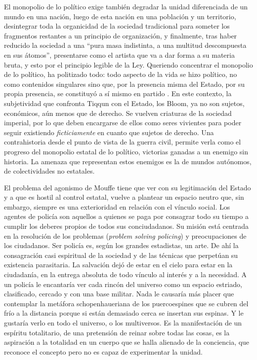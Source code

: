 El monopolio de lo político exige también degradar la unidad diferenciada de un mundo en una nación, luego de esta nación en una población y un territorio, desintegrar toda la organicidad de la sociedad tradicional para someter los fragmentos restantes a un principio de organización, y finalmente, tras haber reducido la sociedad a una \enquote{pura masa indistinta, a una multitud descompuesta en sus átomos}, presentarse como el artista que va a dar forma a su materia bruta, y esto por el principio legible de la Ley. Queriendo concentrar el monopolio de lo político, ha politizado todo: todo aspecto de la vida se hizo político, no como contenidos singulares sino que, por la presencia misma del Estado, por su propia presencia, se constituyó a sí mismo en partido \autocite{tiqqunIntroduccionGuerraCivil2008}. En este contexto, la subjetividad que confronta Tiqqun con el Estado, los Bloom, ya no son sujetos, económicos, aún menos que de derecho. Se vuelven criaturas de la sociedad imperial, por lo que deben encargarse de ellos como seres vivientes para poder seguir existiendo \emph{ficticiamente} en cuanto que sujetos de derecho. Una contrahistoria desde el punto de vista de la guerra civil, permite verla como el progreso del monopolio estatal de lo político, victorias ganadas a un enemigo sin historia. La amenaza que representan estos enemigos es la de mundos autónomos, de colectividades no estatales.

El problema del agonismo de Mouffe tiene que ver con su legitimación del Estado y a que es hostil al control estatal, vuelve a plantear un espacio neutro que, sin embargo, siempre es una exterioridad en relación con el vínculo social. Los agentes de policía son aquellos a quienes se paga por consagrar todo su tiempo a cumplir los deberes propios de todos sus conciudadanos. Su misión está centrada en la resolución de los problemas (\emph{problem solving policing}) y preocupaciones de los ciudadanos. Ser policía es, según los grandes estadistas, un arte. De ahí la consagración casi espiritual de la sociedad y de las técnicas que perpetúan su existencia parasitaria. La salvación dejó de estar en el cielo para estar en la ciudadanía, en la entrega absoluta de todo vínculo al interés y a la necesidad. A un policía le encantaría ver cada rincón del universo como un espacio estriado, clasificado, cercado y con una base militar. Nada le causaría más placer que contemplar la metáfora schopenhaueriana de los puercoespines que se cubren del frío a la distancia porque si están demasiado cerca se insertan sus espinas. Y le gustaría verlo en todo el universo, o los multiversos. Es la manifestación de un espíritu totalitario, de una pretensión de reinar sobre todas las cosas, es la aspiración a la totalidad en un cuerpo que se halla alienado de la conciencia, que reconoce el concepto pero no es capaz de experimentar la unidad.

